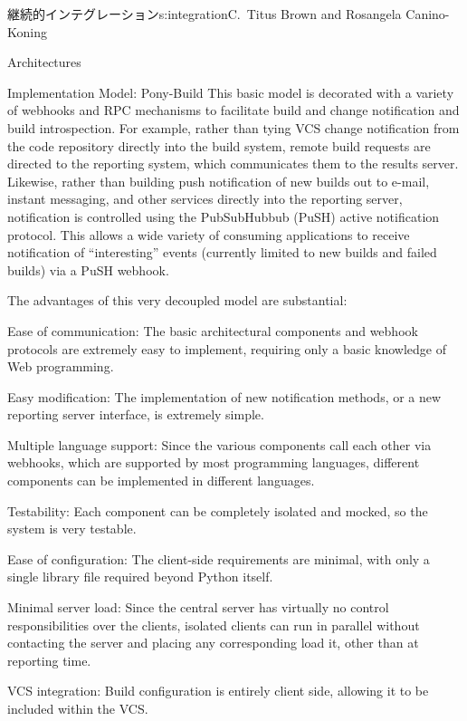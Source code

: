 \begin{aosachapter}{継続的インテグレーション}{s:integration}{C.\ Titus Brown and Rosangela Canino-Koning}
\begin{aosasect1}{Architectures}
\begin{aosasect2}{Implementation Model: Pony-Build}
This basic model is decorated with a variety of webhooks and RPC
mechanisms to facilitate build and change notification and build
introspection. For example, rather than tying VCS change notification
from the code repository directly into the build system, remote build
requests are directed to the reporting system, which communicates them
to the results server. Likewise, rather than building push
notification of new builds out to e-mail, instant messaging, and other
services directly into the reporting server, notification is
controlled using the PubSubHubbub (PuSH) active notification
protocol. This allows a wide variety of consuming applications to
receive notification of ``interesting'' events (currently limited to
new builds and failed builds) via a PuSH webhook.

The advantages of this very decoupled model are substantial:

\begin{aosadescription}

  \item{Ease of communication:} The basic architectural
  components and webhook protocols are extremely easy to implement,
  requiring only a basic knowledge of Web programming.

  \item{Easy modification:} The implementation of new
  notification methods, or a new reporting server interface, is
  extremely simple.

  \item{Multiple language support:} Since the various components
  call each other via webhooks, which are supported by most
  programming languages, different components can be implemented in
  different languages.

  \item{Testability:} Each component can be completely isolated
  and mocked, so the system is very testable.

  \item{Ease of configuration:} The client-side requirements are
  minimal, with only a single library file required beyond Python
  itself.

  \item{Minimal server load:} Since the central server has
  virtually no control responsibilities over the clients, isolated
  clients can run in parallel without contacting the server and
  placing any corresponding load it, other than at reporting time.

  \item{VCS integration:} Build configuration is entirely client
  side, allowing it to be included within the VCS.


\end{aosadescription}
\end{aosasect2}
\end{aosasect1}
\end{aosachapter}
